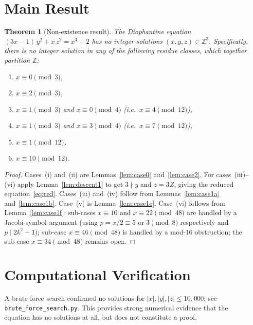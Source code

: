 \documentclass[12pt,a4paper]{article}
\newtheorem{theorem}{Theorem}[section]
\theoremstyle{definition}
\newcommand{\Z}{\mathbb{Z}}
\begin{document}
\section{Main Result}
\label{sec:main}

\begin{theorem}[Non-existence result]\label{thm:main}
  The Diophantine equation $(3x-1)\,y^2 + x\,z^2 = x^3-2$ has no integer
  solutions $(x,y,z)\in\Z^3$.  Specifically, there is no integer solution in
  any of the following residue classes, which together partition $\Z$:
  \begin{enumerate}[label=(\roman*)]
    \item $x \equiv 0 \pmod{3}$,
    \item $x \equiv 2 \pmod{3}$,
    \item $x \equiv 1 \pmod{3}$ and $x \equiv 0 \pmod{4}$
          \quad (i.e.\ $x \equiv 4\pmod{12}$),
    \item $x \equiv 1 \pmod{3}$ and $x \equiv 3 \pmod{4}$
          \quad (i.e.\ $x \equiv 7\pmod{12}$),
    \item $x \equiv 1 \pmod{12}$,
    \item $x \equiv 10 \pmod{12}$.
  \end{enumerate}
\end{theorem}

\begin{proof}
  Cases~(i) and~(ii) are Lemmas~\ref{lem:case0} and~\ref{lem:case2}.
  For cases~(iii)--(vi) apply Lemma~\ref{lem:descent1} to get $3\nmid y$
  and $z = 3Z$, giving the reduced equation~\eqref{eq:red}.
  Cases~(iii) and~(iv) follow from Lemmas~\ref{lem:case1a}
  and~\ref{lem:case1b}.  Case~(v) is Lemma~\ref{lem:case1e}.
  Case~(vi) follows from Lemma~\ref{lem:case1f}: sub-cases
  $x\equiv 10$ and $x\equiv 22\pmod{48}$ are handled by a Jacobi-symbol
  argument (using $p = x/2 \equiv 5$ or $3\pmod{8}$ respectively and
  $p \mid 2k^2-1$); sub-case $x\equiv 46\pmod{48}$ is handled by a
  mod-$16$ obstruction; the sub-case $x\equiv 34\pmod{48}$ remains open.
\end{proof}

\section{Computational Verification}

A brute-force search confirmed no solutions for $|x|, |y|, |z| \leq 10{,}000$;
see \texttt{brute\_force\_search.py}.  This provides strong numerical evidence
that the equation has no solutions at all, but does not constitute a proof.
\end{document}
